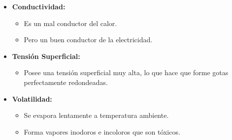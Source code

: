\begin{frame}
  \begin{itemize}
    \item \textbf{Conductividad:}
      \begin{itemize}
        \item Es un mal conductor del calor.
        \item Pero un buen conductor de la electricidad.
      \end{itemize}
      \medskip
    \item \textbf{Tensión Superficial:}
      \begin{itemize}
        \item Posee una tensión superficial muy alta, lo que
          hace que forme gotas perfectamente redondeadas.
      \end{itemize}
      \medskip
    \item \textbf{Volatilidad:}
      \begin{itemize}
        \item Se evapora lentamente a temperatura ambiente.
        \item Forma vapores inodoros e incoloros que son tóxicos.
      \end{itemize}
  \end{itemize}
\end{frame}


